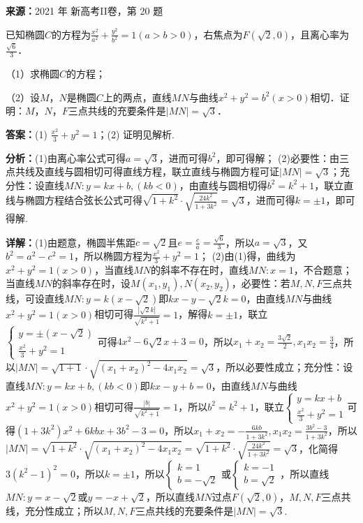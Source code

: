 \begin{question}[points=12]
\textbf{来源：}2021 年 新高考II卷，第 20 题\par
已知椭圆$C$的方程为$\frac{x^2}{a^2}+\frac{y^2}{b^2}=1(a>b>0)$，右焦点为$F(\sqrt{2},0)$，且离心率为$\frac{\sqrt{6}}{3}$．

（1）求椭圆$C$的方程；

（2）设$M$，$N$是椭圆$C$上的两点，直线$MN$与曲线$x^2+y^2=b^2(x>0)$相切．证明：$M$，$N$，$F$三点共线的充要条件是$|MN|=\sqrt{3}$．
\begin{solution}
\textbf{答案：}(1) $\frac{x^2}{3}+y^2=1$；(2) 证明见解析.

\textbf{分析：}(1)由离心率公式可得$a=\sqrt{3}$，进而可得$b^2$，即可得解； (2)必要性：由三点共线及直线与圆相切可得直线方程，联立直线与椭圆方程可证$|MN|=\sqrt{3}$；充分性：设直线$MN:y=kx+b,(kb<0)$，由直线与圆相切得$b^2=k^2+1$，联立直线与椭圆方程结合弦长公式可得$\sqrt{1+k^2}\cdot\sqrt{\frac{24k^2}{1+3k^2}}=\sqrt{3}$，进而可得$k=\pm1$，即可得解.

\textbf{详解：}(1)由题意，椭圆半焦距$c=\sqrt{2}$且$e=\frac{c}{a}=\frac{\sqrt{6}}{3}$，所以$a=\sqrt{3}$，又$b^2=a^2-c^2=1$，所以椭圆方程为$\frac{x^2}{3}+y^2=1$； (2)由(1)得，曲线为$x^2+y^2=1(x>0)$，当直线$MN$的斜率不存在时，直线$MN:x=1$，不合题意；当直线$MN$的斜率存在时，设$M(x_1,y_1),N(x_2,y_2)$，必要性：若$M,N,F$三点共线，可设直线$MN:y=k(x-\sqrt{2})$即$kx-y-\sqrt{2}k=0$，由直线$MN$与曲线$x^2+y^2=1(x>0)$相切可得$\frac{|\sqrt{2}k|}{\sqrt{k^2+1}}=1$，解得$k=\pm1$，联立$\begin{cases} y=\pm(x-\sqrt{2}) \\ \frac{x^2}{3}+y^2=1 \end{cases}$可得$4x^2-6\sqrt{2}x+3=0$，所以$x_1+x_2=\frac{3\sqrt{2}}{2},x_1x_2=\frac{3}{4}$，所以$|MN|=\sqrt{1+1}\cdot\sqrt{(x_1+x_2)^2-4x_1x_2}=\sqrt{3}$，所以必要性成立；充分性：设直线$MN:y=kx+b,(kb<0)$即$kx-y+b=0$，由直线$MN$与曲线$x^2+y^2=1(x>0)$相切可得$\frac{|b|}{\sqrt{k^2+1}}=1$，所以$b^2=k^2+1$，联立$\begin{cases} y=kx+b \\ \frac{x^2}{3}+y^2=1 \end{cases}$可得$(1+3k^2)x^2+6kbx+3b^2-3=0$，所以$x_1+x_2=-\frac{6kb}{1+3k^2},x_1x_2=\frac{3b^2-3}{1+3k^2}$，所以$|MN|=\sqrt{1+k^2}\cdot\sqrt{(x_1+x_2)^2-4x_1x_2}=\sqrt{1+k^2}\cdot\sqrt{\frac{24k^2}{1+3k^2}}=\sqrt{3}$，化简得$3(k^2-1)^2=0$，所以$k=\pm1$，所以$\begin{cases} k=1 \\ b=-\sqrt{2} \end{cases}$或$\begin{cases} k=-1 \\ b=\sqrt{2} \end{cases}$，所以直线$MN:y=x-\sqrt{2}$或$y=-x+\sqrt{2}$，所以直线$MN$过点$F(\sqrt{2},0)$，$M,N,F$三点共线，充分性成立；所以$M,N,F$三点共线的充要条件是$|MN|=\sqrt{3}$.
\end{solution}
\end{question}

